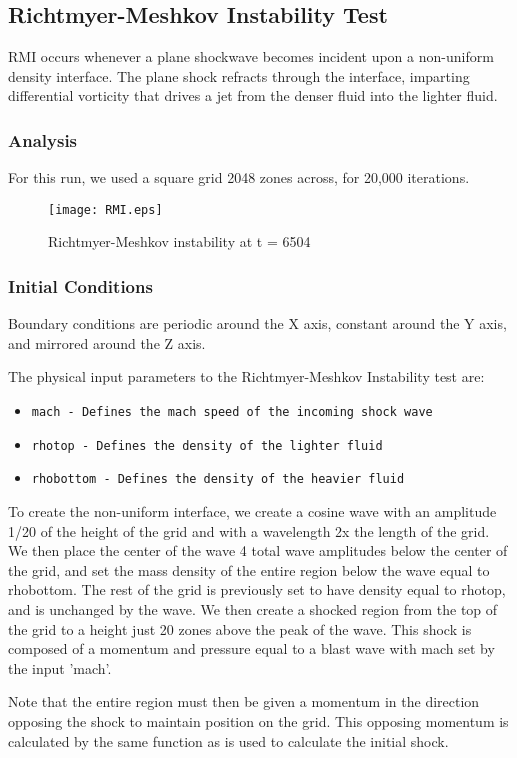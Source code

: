 

\subsection{Richtmyer-Meshkov Instability Test}

RMI occurs whenever a plane shockwave becomes incident upon a non-uniform density interface. 
The plane shock refracts through the interface, imparting differential vorticity that drives
a jet from the denser fluid into the lighter fluid.

\subsubsection{Analysis}

For this run, we used a square grid 2048 zones across, for 20,000 iterations.
\begin{figure*}
\begin{center}
\texttt{[image: RMI.eps]}
\caption{Richtmyer-Meshkov instability at t = 6504}
\end{center}
\end{figure*}

\subsubsection{Initial Conditions}
Boundary conditions are periodic around the X axis, constant around the Y axis, and mirrored around the Z axis.

The physical input parameters to the Richtmyer-Meshkov Instability test are:
\begin{itemize}
\item \tt{mach} - Defines the mach speed of the incoming shock wave
\item \tt{rhotop} - Defines the density of the lighter fluid 
\item \tt{rhobottom} - Defines the density of the heavier fluid
\end{itemize}

To create the non-uniform interface, we create a cosine wave with an amplitude 1/20 of the height 
of the grid and with a wavelength 2x the length of the grid. We then place the center of the wave 
4 total wave amplitudes below the center of the grid, and set the mass density of the entire 
region below the wave equal to rhobottom. The rest of the grid is previously set to have density 
equal to rhotop, and is unchanged by the wave. We then create a shocked region from the top of 
the grid to a height just 20 zones above the peak of the wave. This shock is composed of a momentum 
and pressure equal to a blast wave with mach set by the input 'mach'.

Note that the entire region must then be given a momentum in the direction opposing the shock to 
maintain position on the grid. This opposing momentum is calculated by the same function as is used 
to calculate the initial shock.
